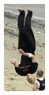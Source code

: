 \begin{figure}[h]
\begin{subfigure}[b]{.1\textwidth}
   \includegraphics[height=2\textwidth]{./images/LSP2}
\end{subfigure}
\begin{subfigure}[b]{.2\textwidth}
	\centering

\end{subfigure}
\end{figure}
